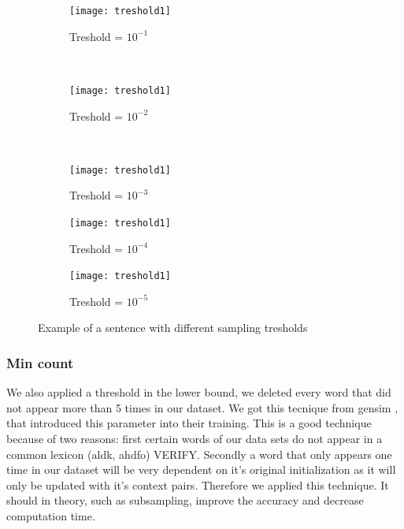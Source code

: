 \begin{figure}
    \centering
    \begin{subfigure}[b]{\textwidth}
        \texttt{[image: treshold1]}
        \caption{Treshold = $10^{-1}$}
        \label{fig:treshold1}
    \end{subfigure}
    ~ %
    \begin{subfigure}[b]{\textwidth}
        \texttt{[image: treshold1]}
        \caption{Treshold = $10^{-2}$}
        \label{fig:treshold2}
    \end{subfigure}
    ~ %
     \begin{subfigure}[b]{\textwidth}
        \texttt{[image: treshold1]}
        \caption{Treshold = $10^{-3}$}
        \label{fig:treshold3}
    \end{subfigure}
   \begin{subfigure}[b]{\textwidth}
        \texttt{[image: treshold1]}
        \caption{Treshold = $10^{-4}$}
        \label{fig:treshold4}
    \end{subfigure}
     \begin{subfigure}[b]{\textwidth}
        \texttt{[image: treshold1]}
        \caption{Treshold = $10^{-5}$}
        \label{fig:treshold5}
    \end{subfigure}
    \caption{Example of a sentence with different sampling tresholds}\label{fig:treshold_examples}
\end{figure}

\subsubsection{Min count}
We also applied a threshold in the lower bound, we deleted every word that did not appear more than 5 times in our dataset. We got this tecnique from gensim \cite{gensim}, that introduced this parameter into their training. This is a good technique because of two reasons: first certain words of our data sets do not appear in a common lexicon (aldk, ahdfo) VERIFY. Secondly a word that only appears one time in our dataset will be very dependent on it's original initialization as it will only be updated with it's context pairs. Therefore we applied this technique. It should in theory, such as subsampling, improve the accuracy and  decrease computation time. 


